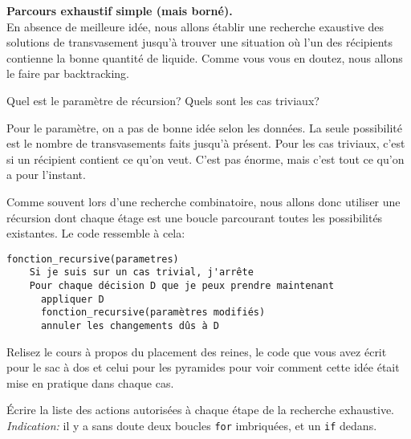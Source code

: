 \documentclass[10pt]{article}\usepackage[correction,nu]{esial}%
\begin{document}

\Exercice\textbf{Parcours exhaustif simple (mais borné).} \\
En absence de meilleure idée, nous allons établir une recherche exaustive des
solutions de transvasement jusqu'à trouver une situation où l'un des récipients
contienne la bonne quantité de liquide. Comme vous vous en doutez, nous allons
le faire par backtracking.

\Question Quel est le paramètre de récursion? Quels sont les cas triviaux?

\begin{Reponse}
  Pour le paramètre, on a pas de bonne idée selon les données. La seule
  possibilité est le nombre de transvasements faits jusqu'à présent. 
  Pour les cas triviaux, c'est si un récipient contient ce qu'on veut. C'est pas
  énorme, mais c'est tout ce qu'on a pour l'instant.
\end{Reponse}

\medskip Comme souvent lors d'une recherche combinatoire, nous allons donc
utiliser une récursion dont chaque étage est une boucle parcourant toutes les
possibilités existantes. Le code ressemble à cela:
\begin{Verbatim}[gobble=2]
  fonction_recursive(parametres)
    Si je suis sur un cas trivial, j'arrête
    Pour chaque décision D que je peux prendre maintenant
      appliquer D
      fonction_recursive(paramètres modifiés)
      annuler les changements dûs à D
\end{Verbatim}

\Question Relisez le cours à propos du placement des reines, le code que vous
avez écrit pour le sac à dos et celui pour les pyramides pour voir comment cette
idée était mise en pratique dans chaque cas.

\Question Écrire la liste des actions autorisées à chaque étape de la recherche
exhaustive.\\ \textit{Indication:} il y a sans doute deux boucles \texttt{for}
imbriquées, et un \texttt{if} dedans.
\end{document}

